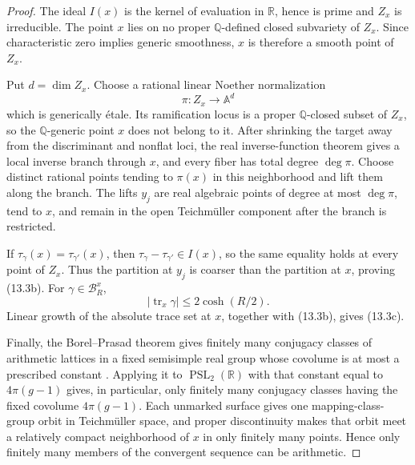 \documentclass[11pt,reqno]{amsart}
\theoremstyle{definition}
\theoremstyle{remark}
\newcommand{\R}{\mathbb R}
\newcommand{\Q}{\mathbb Q}
\newcommand{\Tr}{\operatorname{tr}}
\newcommand{\PSL}{\operatorname{PSL}}
\begin{document}
\begin{proof}
The ideal \(I(x)\) is the kernel of evaluation in \(\R\), hence is prime
and \(Z_x\) is irreducible.  The point \(x\) lies on no proper
\(\Q\)-defined closed subvariety of \(Z_x\).  Since characteristic zero
implies generic smoothness, \(x\) is therefore a smooth point of \(Z_x\).

Put \(d=\dim Z_x\).  Choose a rational linear Noether normalization
\[
 \pi:Z_x\longrightarrow\mathbb A^d
\]
which is generically \'etale.  Its ramification locus is a proper
\(\Q\)-closed subset of \(Z_x\), so the \(\Q\)-generic point \(x\) does
not belong to it.  After shrinking the target away from the discriminant
and nonflat loci, the real inverse-function theorem gives a local
inverse branch through \(x\), and every fiber has total degree
\(\deg\pi\).  Choose distinct rational points tending to \(\pi(x)\) in
this neighborhood and lift them along the branch.  The lifts \(y_j\) are
real algebraic points of degree at most \(\deg\pi\), tend to \(x\), and
remain in the open Teichm\"uller component after the branch is restricted.

If \(\tau_\gamma(x)=\tau_{\gamma'}(x)\), then
\(\tau_\gamma-\tau_{\gamma'}\in I(x)\), so the same equality holds at
every point of \(Z_x\).  Thus the partition at \(y_j\) is coarser than
the partition at \(x\), proving (13.3b).  For
\(\gamma\in\mathcal B_R^x\),
\[
 |\Tr_x\gamma|\le2\cosh(R/2).
\]
Linear growth of the absolute trace set at \(x\), together with (13.3b),
gives (13.3c).

Finally, the Borel--Prasad theorem gives finitely many conjugacy classes of
arithmetic lattices in a fixed semisimple real group whose covolume is at
most a prescribed constant \cite{BorelPrasad}.  Applying it to
\(\PSL_2(\R)\) with that constant equal to \(4\pi(g-1)\) gives, in
particular, only finitely many conjugacy classes having the fixed covolume
\(4\pi(g-1)\).  Each unmarked surface gives one
mapping-class-group orbit in Teichm\"uller space, and proper discontinuity
makes that orbit meet a relatively compact neighborhood of \(x\) in only
finitely many points.  Hence only finitely many members of the convergent
sequence can be arithmetic.
\end{proof}
\end{document}
